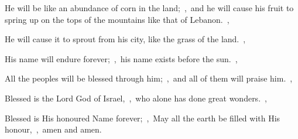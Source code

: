 \documentclass[12pt,twoside,a5paper]{article}
\begin{document}
\begin{normalparskip}
  He will be like an abundance of corn in the land;~\sep\ and he will cause his fruit to spring up on the tops of the mountains like that of Lebanon.~\sep

  He will cause it to sprout from his city, like the grass of the land.~\sep

  His name will endure forever;~\sep\ his name exists before the sun.~\sep

  All the peoples will be blessed through him;~\sep\ and all of them will praise him.~\sep

  Blessed is the Lord God of Israel,~\sep\ who alone has done great wonders.~\sep

  Blessed is His honoured Name forever;~\sep\ May all the earth be filled with His honour,~\sep\ amen and amen.
\end{normalparskip}



\end{document}
